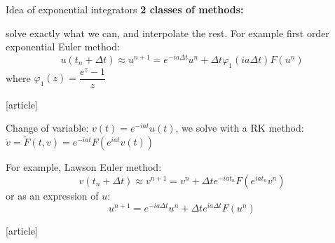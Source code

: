 \documentclass{beamer}
\newcommand{\mbold}[1]{{\textbf{\color{PLB}#1}}}
\newcommand{\customcite}[1]{\cite{#1}}
\begin{document}
\begin{frame}{Idea of exponential integrators}
  \textbf{\color{mblue} 2 classes of methods:}
  \begin{description}[leftmargin=0.25cm]
    \item[\mbold{exponential Runge-Kutta:}] solve exactly what we can, and interpolate the rest. For example first order exponential Euler method:
      $$
        u(t_n+\Delta t) \approx u^{n+1} = e^{-ia\Delta t}u^n + \Delta t\varphi_1(ia\Delta t)F(u^n)
      $$
      where $\varphi_1(z) = \dfrac{e^z - 1}{z}$
      \vspace{-0.1cm}
      \begin{thebibliography}{9}
        [article]
         \customcite{Hochbruck:2010}
      \end{thebibliography}
    \item[\mbold{Lawson:}] Change of variable: $v(t)=e^{-iat}u(t)$, we solve with a RK method: $\dot{v} = \tilde{F}(t,v) = e^{-iat}F(e^{iat}v(t))$

      For example, Lawson Euler method:
      $$
        v(t_n+\Delta t)\approx v^{n+1} = v^n + \Delta t e^{-iat_n}F(e^{iat_n}v^n)
      $$
      or as an expression of $u$:
      $$
        u^{n+1} = e^{-ia\Delta t}u^n + \Delta te^{ia\Delta t}F(u^n)
      $$
      \vspace{-0.75cm}
      \begin{thebibliography}{9}
        [article]
         \customcite{Isherwood:2018}
      \end{thebibliography}
  \end{description}
\end{frame}
\end{document}
